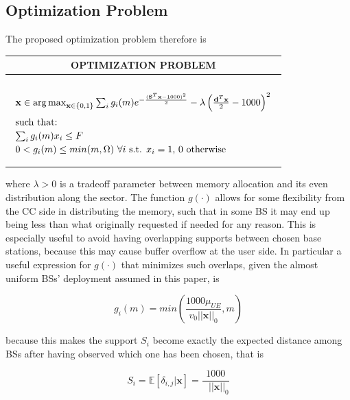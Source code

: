 \documentclass[conference,10pt]{IEEEtran}
\DeclareMathOperator*{\argmax}{arg\,max}
\begin{document}
\subsection{Optimization Problem}

The proposed optimization problem therefore is

\begin{center}
	\begin{tabular}[h]{|c|}
		
		\hline
		OPTIMIZATION PROBLEM \\
		\hline
		\vbox{
			$			
			\begin{array}{l l l l l l}
				\null \\[1ex]
				\mathbf{x} \in \argmax_{\mathbf{x} \in \{0,1\}} \sum_i{g_i(m)e^{-\frac{(\mathbf{S}^T\mathbf{x} - 1000)^2}{2}}} - \lambda\left(\frac{\mathbf{d}^T\mathbf{x}}{2} - 1000\right)^2 \\	[2ex]
				\textrm{such that:}\\[0.5ex]	
				\sum_i{g_i(m)x_i} \le F\\[0.5ex]		
				0  < g_i(m) \le min(m, \Omega) \textrm{ } \forall i \textrm{ s.t. } x_i  = 1 \textrm{,   0 otherwise}
				\null \\[2ex]
			\end{array}
			$
		}\\
		\hline
	\end{tabular}
\end{center}

where $\lambda > 0$ is a tradeoff parameter between memory allocation and its even distribution along the sector. The function $g(\cdot)$ allows for some flexibility from the CC side in distributing the memory, such that in some BS it may end up being less than what originally requested if needed for any reason. This is especially useful to avoid having overlapping supports between chosen base stations, because this may cause buffer overflow at the user side. In particular a useful expression for $g(\cdot)$ that minimizes such overlaps, given the almost uniform BSs' deployment assumed in this paper, is 

\begin{equation}
g_i(m) = min\left(\frac{1000\mu_{U\!E}}{v_0 ||\mathbf{x}||_0}, m\right)
\end{equation} 

because this makes the support $S_i$ become exactly the expected distance among BSs after having observed which one has been chosen, that is

\begin{equation}
S_i = \mathbb{E}{[\delta_{i, j}| \mathbf{x}]} =  \frac{1000}{\textrm{ }||\mathbf{x}||_0}
\end{equation} 
\end{document}
